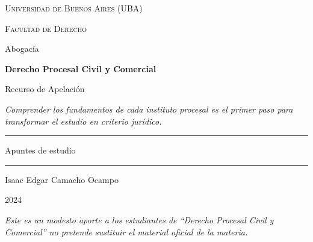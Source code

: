 \documentclass[12pt,oneside]{book}
\newcommand{\universidad}{Universidad de Buenos Aires (UBA)}
\newcommand{\facultad}{Facultad de Derecho}
\newcommand{\carrera}{Abogacía}
\newcommand{\materia}{Derecho Procesal Civil y Comercial}
\newcommand{\titulo}{Recurso de Apelación}
\newcommand{\autor}{Isaac Edgar Camacho Ocampo}
\newcommand{\anio}{2024}
\begin{document}
\begin{titlepage}
\thispagestyle{empty}

\begin{center}

\vspace*{1cm}

{\large \textsc{\universidad}}

\vspace{0.2cm}

{\large \textsc{\facultad}}

\vspace{0.2cm}

{\large \carrera}

\vspace{3cm}

{\Huge \textbf{\materia}}

\vspace{1cm}

{\LARGE \titulo}

\vspace{0.8cm}

\textit{Comprender los fundamentos de cada instituto procesal es el primer paso para transformar el estudio en criterio jurídico.}

\vspace{1.2cm}

\rule{0.70\textwidth}{0.5pt}

\vspace{0.5cm}

{\large Apuntes de estudio}

\vspace{0.5cm}

\rule{0.70\textwidth}{0.5pt}

\vfill

{\large \autor}

\vspace{0.3cm}

{\large \anio}

\end{center}

\vfill

\begin{flushleft}
\textit{Este es un modesto aporte a los estudiantes de ``Derecho Procesal Civil y Comercial'' no pretende sustituir el material oficial de la materia.}
\end{flushleft}

\end{titlepage}
\end{document}
